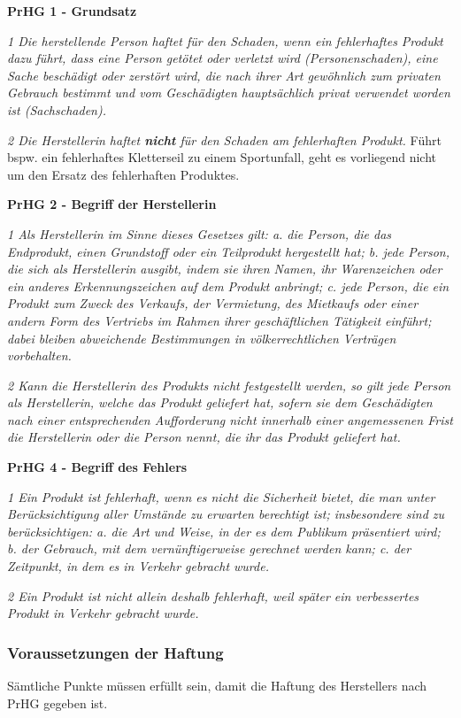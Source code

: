 \textbf{PrHG 1 - Grundsatz}

\textit{1 Die herstellende Person haftet für den Schaden, wenn ein fehlerhaftes Produkt dazu führt, dass eine Person getötet oder verletzt wird (Personenschaden), eine Sache beschädigt oder zerstört wird, die nach ihrer Art gewöhnlich zum privaten Gebrauch bestimmt und vom Geschädigten hauptsächlich privat verwendet worden ist (Sachschaden).}

\textit{2 Die Herstellerin haftet \textbf{nicht} für den Schaden am fehlerhaften Produkt.} Führt bspw. ein fehlerhaftes Kletterseil zu einem Sportunfall, geht es vorliegend nicht um den Ersatz des fehlerhaften Produktes.
\vspace{3mm}

\textbf{PrHG 2 - Begriff der Herstellerin}

\textit{1 Als Herstellerin im Sinne dieses Gesetzes gilt:
a. die Person, die das Endprodukt, einen Grundstoff oder ein Teilprodukt hergestellt hat;
b. jede Person, die sich als Herstellerin ausgibt, indem sie ihren Namen, ihr Warenzeichen oder ein anderes Erkennungszeichen auf dem Produkt anbringt;
c. jede Person, die ein Produkt zum Zweck des Verkaufs, der Vermietung, des Mietkaufs oder einer andern Form des Vertriebs im Rahmen ihrer geschäftlichen Tätigkeit einführt; dabei bleiben abweichende Bestimmungen in völkerrechtlichen Verträgen vorbehalten.}

\textit{2 Kann die Herstellerin des Produkts nicht festgestellt werden, so gilt jede Person als Herstellerin, welche das Produkt geliefert hat, sofern sie dem Geschädigten nach einer entsprechenden Aufforderung nicht innerhalb einer angemessenen Frist die Herstellerin oder die Person nennt, die ihr das Produkt geliefert hat.}
\vspace{3mm}

\noindent
\textbf{PrHG 4 - Begriff des Fehlers}

\textit{1 Ein Produkt ist fehlerhaft, wenn es nicht die Sicherheit bietet, die man unter Berücksichtigung aller Umstände zu erwarten berechtigt ist; insbesondere sind zu berücksichtigen:
a. die Art und Weise, in der es dem Publikum präsentiert wird;
b. der Gebrauch, mit dem vernünftigerweise gerechnet werden kann;
c. der Zeitpunkt, in dem es in Verkehr gebracht wurde.}

\textit{2 Ein Produkt ist nicht allein deshalb fehlerhaft, weil später ein verbessertes Produkt in Verkehr gebracht wurde.}

\noindent
\subsubsection*{Voraussetzungen der Haftung}
Sämtliche Punkte müssen erfüllt sein, damit die Haftung des Herstellers nach PrHG gegeben ist.

